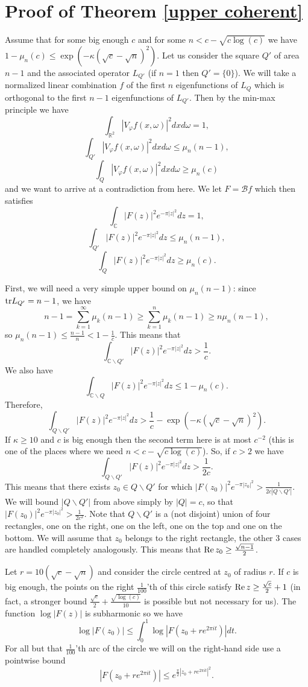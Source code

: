 \documentclass[12pt]{amsart}
\numberwithin{equation}{section}
\newcommand{\R}{\mathbb{R}}
\newcommand{\Cm}{\mathbb{C}}
\newcommand{\B}{\mathcal{B}}
\renewcommand{\phi}{\varphi}
\begin{document}
\section{Proof of Theorem \ref{upper coherent}}\label{UPC}
Assume that for some big enough $c$ and for some $n < c - \sqrt{c\log(c)}$ we have $1-\mu_n(c)  \le \exp(-\kappa (\sqrt{c}-\sqrt{n})^2)$. Let us consider the square $Q'$ of area $n-1$ and the associated operator $L_{Q'}$ (if $n = 1$ then $Q' = \{0\}$). We will take a normalized linear combination $f$ of the first $n$ eigenfunctions of $L_Q$ which is orthogonal to the first $n-1$ eigenfunctions of $L_{Q'}$. Then by the min-max principle we have 
$$\int_{\R^2} |V_\phi f(x, \omega)|^2dxd\omega = 1,$$
$$\int_{Q'} |V_\phi f(x,\omega)|^2dxd\omega \le \mu_n(n-1),$$
$$\int_{Q} |V_\phi f(x,\omega)|^2dxd\omega \ge \mu_n(c)$$
and we want to arrive at a contradiction from here. We let $F = \B f$ which then satisfies
$$\int_\Cm |F(z)|^2e^{-\pi |z|^2}dz = 1,$$
$$\int_{Q'} |F(z)|^2e^{-\pi |z|^2}dz\le \mu_n(n-1),$$
$$\int_Q |F(z)|^2e^{-\pi |z|^2}dz \ge \mu_n(c).$$

First, we will need a very simple upper bound on $\mu_n(n-1)$: since ${\rm tr} L_{Q'} = n-1$, we have 
$$n-1=\sum_{k=1}^\infty \mu_k(n-1) \ge \sum_{k=1}^n \mu_k(n-1) \ge n\mu_n(n-1),$$
so $\mu_n(n-1) \le \frac{n-1}{n} < 1-\frac{1}{c}$. This means that
$$\int_{\Cm\backslash Q'} |F(z)|^2e^{-\pi |z|^2}dz > \frac{1}{c}.$$
We also have
$$\int_{\Cm \backslash Q} |F(z)|^2e^{-\pi |z|^2}dz \le 1-\mu_n(c).$$
Therefore,
$$\int_{Q\backslash Q'} |F(z)|^2e^{-\pi |z|^2}dz >\frac{1}{c} - \exp(-\kappa (\sqrt{c}-\sqrt{n})^2).$$
If $\kappa \ge 10$ and $c$ is big enough then the second term here is at most $c^{-2}$ (this is one of the places where we need $n <c -\sqrt{c\log(c)}$). So, if $c > 2$ we have
$$\int_{Q\backslash Q'} |F(z)|^2 e^{-\pi |z|^2}dz > \frac{1}{2c}.$$
This means that there exists $z_0\in Q\backslash Q'$ for which $|F(z_0)|^2 e^{-\pi |z_0|^2} > \frac{1}{2c |Q\backslash Q'|}$. We will bound $|Q\backslash Q'|$ from above simply by $|Q| = c$, so that $|F(z_0)|^2 e^{-\pi |z_0|^2} > \frac{1}{2c^2}$. Note that $Q\backslash Q'$ is a (not disjoint) union of four rectangles, one on the right, one on the left, one on the top and one on the bottom. We will assume that $z_0$ belongs to the right rectangle, the other $3$ cases are handled completely analogously. This means that ${\rm Re}\, z_0 \ge \frac{\sqrt{n-1}}{2}$.

Let $r = 10(\sqrt{c}-\sqrt{n})$ and consider the circle centred at $z_0$ of radius $r$. If $c$ is big enough, the points on the right $\frac{1}{100}$'th of this circle satisfy ${\rm Re}\, z \ge \frac{\sqrt{c}}{2}+1$ (in fact, a stronger bound $\frac{\sqrt{c}}{2} + \frac{\sqrt{\log(c)}}{10}$ is possible but not necessary for us). The function $\log |F(z)|$ is subharmonic so we have
\begin{equation}\label{subh1}
\log |F(z_0)| \le \int_0^1 \log |F(z_0 + re^{2\pi i t})|dt.
\end{equation}
For all but that $\frac{1}{100}$'th arc of the circle we will on the right-hand side use a pointwise bound $$|F(z_0 + re^{2\pi i t})| \le e^{\frac{\pi}{2}|z_0+re^{2\pi i t}|^2}.$$
\end{document}
